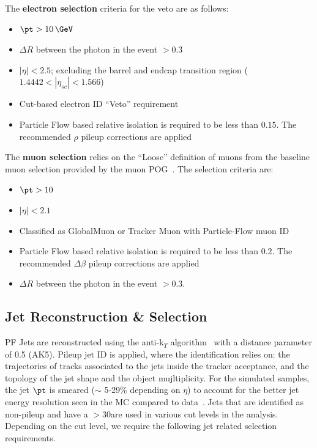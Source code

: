 The {\bf electron selection} criteria for the veto are as follows:

\begin{itemize}
\item $\pt>10\,\GeV$
\item $\Delta R$ between the photon in the event $>0.3$
\item $|\eta| < 2.5$; excluding the barrel and endcap transition region ($ 1.4442 < |\eta_{sc}| < 1.566$)
\item Cut-based electron ID ``Veto'' requirement
\item Particle Flow based relative isolation  is required to be less than $ 0.15$. The recommended $\rho$ pileup corrections are applied
\end{itemize}

The {\bf muon selection} relies on the ``Loose'' definition of muons from the baseline muon selection provided by the muon POG~\cite{muonid}. The selection criteria are: 

\begin{itemize}
\item  $\pt > 10$\,\GeV
\item  $|\eta| < 2.1$
\item Classified as GlobalMuon or Tracker Muon with Particle-Flow muon ID
\item Particle Flow based relative isolation  is required to be less than $ 0.2$. The recommended $\Delta \beta$ pileup corrections are applied~\cite{TQRS}
\item $\Delta R$ between the photon in the event $>0.3$.
\end{itemize}

\subsection{Jet Reconstruction \& Selection}
\label{sec:jet}

PF Jets are reconstructed using the anti-k$_T$ algorithm~\cite{Cacciari:2008gp} with a distance parameter of 0.5 (AK5). Pileup jet ID is applied, where the identification relies on: the trajectories of tracks associated to the jets  inside the tracker acceptance, and the topology of the jet shape and the object mujltiplicity. For the simulated samples, the jet $\pt$ is smeared ($\sim$ 5-29\% depending on $\eta$) to account for the better jet energy resolution seen in the MC compared to data~\cite{JetResolutiontwiki}. Jets that are identified as non-pileup and have a \pt $ > 30 $\GeV are used in various cut levels in the analysis. Depending on the cut level, we require the following jet related selection requirements.


